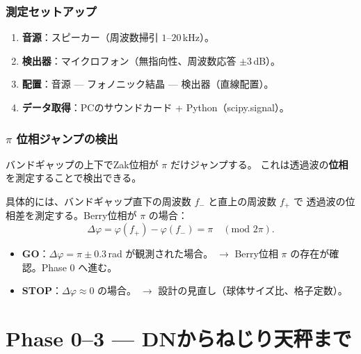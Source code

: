 \subsection{測定セットアップ}

\begin{enumerate}[label=(\alph*)]
  \item \textbf{音源}：スピーカー（周波数掃引 $1$--$20$\,kHz）。
  \item \textbf{検出器}：マイクロフォン（無指向性、周波数応答 $\pm 3$\,dB）。
  \item \textbf{配置}：音源 --- フォノニック結晶 --- 検出器（直線配置）。
  \item \textbf{データ取得}：PCのサウンドカード + Python（scipy.signal）。
\end{enumerate}

\subsection{$\pi$ 位相ジャンプの検出}

バンドギャップの上下でZak位相が $\pi$ だけジャンプする。
これは透過波の\textbf{位相}を測定することで検出できる。

具体的には、バンドギャップ直下の周波数 $f_-$ と直上の周波数 $f_+$ で
透過波の位相差を測定する。Berry位相が $\pi$ の場合：
\[
  \Delta\varphi = \varphi(f_+) - \varphi(f_-) = \pi \quad (\text{mod } 2\pi).
\]

\begin{experimentbox}
\begin{itemize}
  \item \textbf{GO}：$\Delta\varphi = \pi \pm 0.3$\,rad が観測された場合。
        $\to$ Berry位相 $\pi$ の存在が確認。Phase 0 へ進む。
  \item \textbf{STOP}：$\Delta\varphi \approx 0$ の場合。
        $\to$ 設計の見直し（球体サイズ比、格子定数）。
\end{itemize}
\end{experimentbox}


\chapter{Phase 0--3 --- DNからねじり天秤まで}
\label{ch:phases-0-3}

